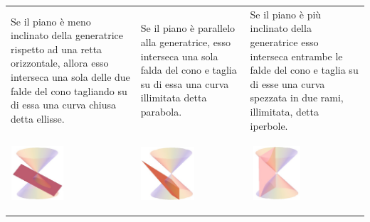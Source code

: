 \begin{center}
\begin{tabular}{p{} p{} p{}}
Se il piano è meno inclinato della generatrice rispetto ad 
una retta orizzontale, allora esso interseca una sola delle due falde del 
cono tagliando su di essa una curva chiusa detta ellisse. 
& 
Se il piano è parallelo alla generatrice, esso interseca 
una sola falda del cono e taglia su di essa una curva illimitata detta 
parabola. 
& 
Se il piano è più inclinato della generatrice esso 
interseca entrambe le falde del cono e taglia su di esse una curva spezzata 
in due rami, illimitata, detta iperbole. \\
\begin{center}
\begin{inaccessibleblock}
  \includegraphics[height=2cm, width=2cm]{img/elisse2.jpg}
  \label{fig:elisse2}
\end{inaccessibleblock} 
\end{center}
& 
\begin{center}
\begin{inaccessibleblock}
  \includegraphics[height=2cm, width=2cm]{img/parabola3.jpg}
  \label{fig:parabola3}
\end{inaccessibleblock} 
\end{center}
&
\begin{center}
\begin{inaccessibleblock}
  \includegraphics[height=2cm, width=2cm]{img/iperbole2.jpg}
  \label{fig:iperbole2}
\end{inaccessibleblock}
\end{center}
\end{tabular}
\end{center}

